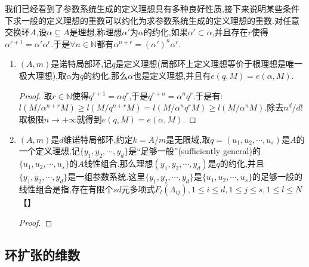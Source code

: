 我们已经看到了参数系统生成的定义理想具有多种良好性质,接下来说明某些条件下求一般的定义理想的重数可以约化为求参数系统生成的定义理想的重数.对任意交换环$A$,设$\alpha\subseteq A$是理想,称理想$\alpha'$为$\alpha$的约化,如果$\alpha'\subset\alpha$,并且存在$r$使得$\alpha^{r+1}=\alpha'\alpha^r$.于是$\forall n\in\mathbb{N}$都有$\alpha^{n+r}=(\alpha')^n\alpha^r$.
\begin{enumerate}
	\item $(A,m)$是诺特局部环,记$q$是定义理想(局部环上定义理想等价于根理想是唯一极大理想),取$\alpha$为$q$的约化,那么$\alpha$也是定义理想,并且有$e(q,M)=e(\alpha,M)$.
	\begin{proof}
		
		取$r\in\mathbb{N}$使得$q^{r+1}=\alpha q^r$,于是$q^{r+n}=\alpha^nq^r$.于是有:$l(M/\alpha^{n+r}M)\ge l(M/q^{n+r}M)=l(M/\alpha^nq^rM)\ge l(M/\alpha^nM)$.除去$n^d/d!$取极限$n\to+\infty$就得到$e(q,M)=e(\alpha,M)$.
	\end{proof}
	\item $(A,m)$是$d$维诺特局部环,约定$k=A/m$是无限域,取$q=(u_1,u_2,\cdots,u_s)$是$A$的一个定义理想,记$\{y_1,y_2,\cdots,y_d\}$是“足够一般”(sufficiently general)的$\{u_1,u_2,\cdots,u_s\}$的$A$线性组合,那么理想$(y_1,y_2,\cdots,y_d)$是$q$的约化,并且$\{y_1,y_2,\cdots,y_d\}$是一组参数系统.这里$\{y_1,y_2,\cdots,y_d\}$是$\{u_1,u_2,\cdots,u_s\}$的足够一般的线性组合是指,存在有限个$sd$元多项式$F_l(\Lambda_{ij}),1\le i\le d,1\le j\le s,1\le l\le N$【】
	\begin{proof}
		
		
	\end{proof}
\end{enumerate}
\newpage
\subsection{环扩张的维数}


